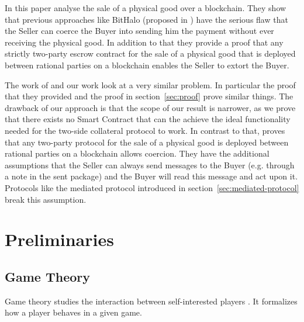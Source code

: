\documentclass{cacthesis}
\newcommand{\authnote}[3]{{ \footnotesize \textbf{#1[#2: #3]~}}}
\newcommand{\niknote}[1]{\authnote{\color{red}}{Nikos}{#1}}
\begin{document}
In this paper \citeauthor{goharshady_irrationality_2021} analyse the sale of a physical good over a blockchain. They show that previous approaches like BitHalo (proposed in \cite{zimbeck_two_nodate}) have the serious flaw that the Seller can coerce the Buyer into sending him the payment without ever receiving the physical good. In addition to that they provide a proof that any strictly two-party escrow contract for the sale of a physical good that is deployed between rational parties on a blockchain enables the Seller to extort the Buyer.\newline

The work of \citeauthor{goharshady_irrationality_2021} and our work look at a very similar problem. In particular the proof that they provided and the proof in section~\ref{sec:proof} prove similar things. The drawback of our approach is that the scope of our result is narrower, as we prove that there exists no Smart Contract that can the achieve the ideal functionality needed for the two-side collateral protocol to work. In contrast to that, \citeauthor{goharshady_irrationality_2021} proves that any two-party protocol for the sale of a physical good is deployed between rational parties on a blockchain allows coercion. They have the additional assumptions that the Seller can always send messages to the Buyer (e.g. through a note in the sent package) and the Buyer will read this message and act upon it. Protocols like the mediated protocol introduced in section~\ref{sec:mediated-protocol} break this assumption.

\chapter{Preliminaries}
\label{cha:preliminaries}

\section{Game Theory}
Game theory studies the interaction between self-interested players \cite{leyton-brown_essentials_2008}. It formalizes how a player behaves in a given game.
\end{document}
